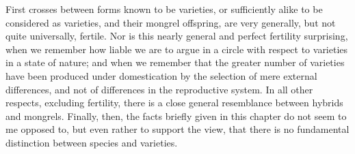 First crosses between forms known to be varieties, or sufficiently alike to be considered as varieties, and their mongrel offspring, are very generally, but not quite universally, fertile. Nor is this nearly general and perfect fertility surprising, when we remember how liable we are to argue in a circle with respect to varieties in a state of nature; and when we remember that the greater number of varieties have been produced under domestication by the selection of mere external differences, and not of differences in the reproductive system. In all other respects, excluding fertility, there is a close general resemblance between hybrids and mongrels. Finally, then, the facts briefly given in this chapter do not seem to me opposed to, but even rather to support the view, that there is no fundamental distinction between species and varieties. 